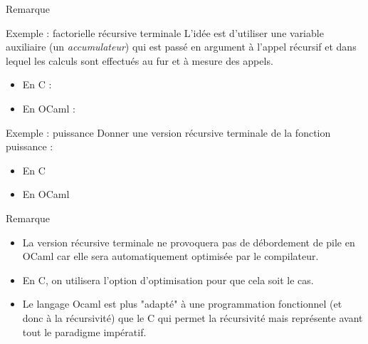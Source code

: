 \documentclass[10pt]{beamer}
\begin{document}
\begin{frame}[fragile]{\Ctitle}{\stitle}
\begin{block}{Remarque}
	\end{block}

\end{frame}

\begin{frame}{\Ctitle}{\stitle}
	\begin{exampleblock}{Exemple :  factorielle récursive terminale}
		L'idée est d'utiliser une variable auxiliaire (un \textit{accumulateur}) qui est passé en argument à l'appel récursif et dans lequel les calculs sont effectués au fur et à mesure des appels.
		\begin{itemize}
			\item<2->En C :
			\onslide<2->
			\item<2->En OCaml :
			\onslide<2->
		\end{itemize}
	\end{exampleblock}
\end{frame}

\begin{frame}{\Ctitle}{\stitle}
	\begin{exampleblock}{Exemple :  puissance}
		Donner une version récursive terminale de la fonction puissance :
		\begin{itemize}
			\item<2-> En C
				\onslide<3->
			\item<4-> En OCaml
				\onslide<4->
		\end{itemize}
	\end{exampleblock}
\end{frame}

\begin{frame}{\Ctitle}{\stitle}
	\begin{block}{Remarque}
		\begin{itemize}
			\item<1-> La version récursive terminale ne provoquera pas de débordement de pile en OCaml car elle sera automatiquement optimisée par le compilateur.
			\item<2-> En C, on utilisera l'option d'optimisation  pour que cela soit le cas.
			\item<3-> Le langage Ocaml est plus "adapté" à une programmation fonctionnel (et donc à la récursivité) que le C qui permet la récursivité mais représente avant tout le paradigme impératif.
		\end{itemize}
	\end{block}
\end{frame}
\end{document}
